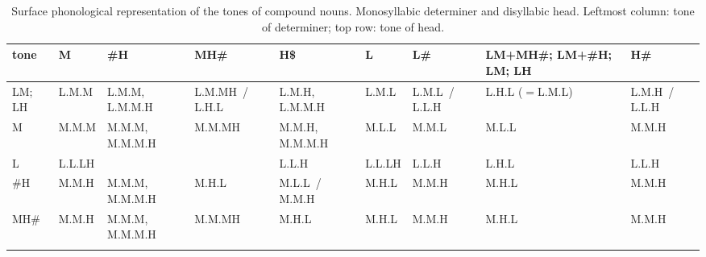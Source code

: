 \begin{subtables}
\begin{table}%
\caption{\label{tab:surfacedisyllabicmonosyllables}Surface phonological representation of the tones of compound nouns. Monosyllabic determiner and disyllabic head. Leftmost column: tone of determiner; top row: tone of head.}
{\renewcommand{\arraystretch}{1.35}
\begin{tabularx}{\textwidth}{ Q Q Q Q Q Q Q Q Q }
\lsptoprule
	tone & M & \#H & MH\# & H\$ & L & L\# & LM+MH\#; LM+\#H; LM; LH & H\#\\\midrule
	LM; LH & L.M.M & L.M.M, L.M.M.H & L.M.MH~/ L.H.L & L.M.H, L.M.M.H & L.M.L & L.M.L~/ L.L.H & L.H.L ($=$L.M.L) & L.M.H~/ L.L.H\\
	M & M.M.M & M.M.M, M.M.M.H & M.M.MH & M.M.H, M.M.M.H & M.L.L & M.M.L & M.L.L & M.M.H\\
	L & L.L.LH &  &  \hspace*{\fill} & L.L.H & L.L.LH & L.L.H & L.H.L & L.L.H\\
	\#H & M.M.H & M.M.M, M.M.M.H & M.H.L & M.L.L~/ M.M.H & M.H.L &
   M.M.H & M.H.L & M.M.H\\ 
	MH\# & M.M.H & M.M.M, M.M.M.H & M.M.MH & M.H.L & M.H.L & M.M.H & M.H.L & M.M.H\\
\lspbottomrule
\end{tabularx}}
\end{table}



\end{subtables}
